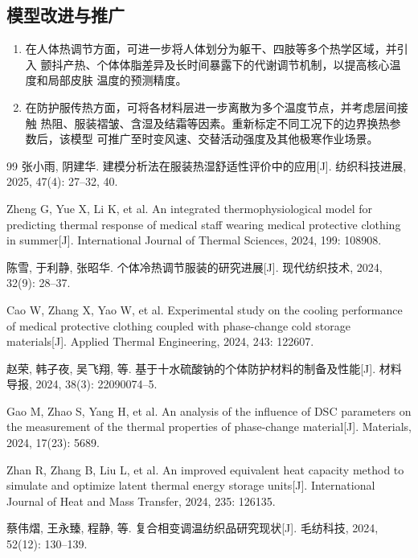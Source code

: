 \documentclass[withoutpreface,bwprint]{cumcmthesis}
\begin{document}
\subsection{模型改进与推广}
\begin{enumerate}
    \item 在人体热调节方面，可进一步将人体划分为躯干、四肢等多个热学区域，并引入
    颤抖产热、个体体脂差异及长时间暴露下的代谢调节机制，以提高核心温度和局部皮肤
    温度的预测精度。
    \item 在防护服传热方面，可将各材料层进一步离散为多个温度节点，并考虑层间接触
    热阻、服装褶皱、含湿及结霜等因素。重新标定不同工况下的边界换热参数后，该模型
    可推广至时变风速、交替活动强度及其他极寒作业场景。
\end{enumerate}
\newpage
\begin{thebibliography}{99}
    张小雨, 阴建华. 建模分析法在服装热湿舒适性评价中的应用[J].
    纺织科技进展, 2025, 47(4): 27--32, 40.

    Zheng G, Yue X, Li K, et al. An integrated thermophysiological model for predicting
    thermal response of medical staff wearing medical protective clothing in summer[J].
    International Journal of Thermal Sciences, 2024, 199: 108908.

    陈雪, 于利静, 张昭华. 个体冷热调节服装的研究进展[J].
    现代纺织技术, 2024, 32(9): 28--37.

    Cao W, Zhang X, Yao W, et al. Experimental study on the cooling performance of
    medical protective clothing coupled with phase-change cold storage materials[J].
    Applied Thermal Engineering, 2024, 243: 122607.

    赵荣, 韩子夜, 吴飞翔, 等. 基于十水硫酸钠的个体防护材料的制备及性能[J].
    材料导报, 2024, 38(3): 22090074--5.

    Gao M, Zhao S, Yang H, et al. An analysis of the influence of DSC parameters on the
    measurement of the thermal properties of phase-change material[J].
    Materials, 2024, 17(23): 5689.

    Zhan R, Zhang B, Liu L, et al. An improved equivalent heat capacity method to simulate
    and optimize latent thermal energy storage units[J].
    International Journal of Heat and Mass Transfer, 2024, 235: 126135.

    蔡伟熠, 王永臻, 程静, 等. 复合相变调温纺织品研究现状[J].
    毛纺科技, 2024, 52(12): 130--139.


\end{thebibliography}
\end{document}
